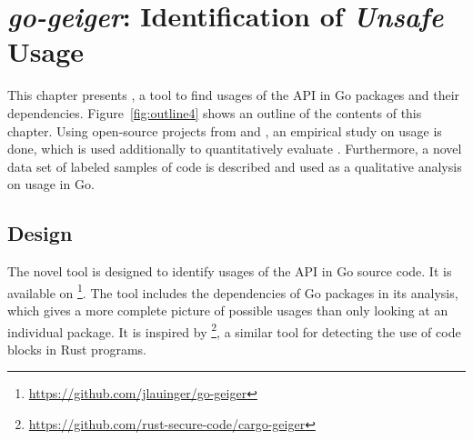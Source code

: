 
\chapter{\textit{go-geiger}: Identification of \textit{Unsafe} Usage}\label{ch:go-geiger}

This chapter presents \toolGeiger{}, a tool to find usages of the \unsafe{} \acrshort{API} in Go packages and their
dependencies.
Figure~\ref{fig:outline4} shows an outline of the contents of this chapter.
Using open-source projects from \github{} and \toolGeiger{}, an empirical study on \unsafe{} usage is done, which is
used additionally to quantitatively evaluate \toolGeiger{}.
Furthermore, a novel data set of labeled samples of \unsafe{} code is described and used as a qualitative analysis on
\unsafe{} usage in Go.





\section{Design}\label{sec:go-geiger:design}

The novel tool \toolGeiger{} is designed to identify usages of the \unsafe{} \acrshort{API} in Go source code.
It is available on \github{}\footnote{\url{https://github.com/jlauinger/go-geiger}}.
The tool includes the dependencies of Go packages in its analysis, which gives a more complete picture of possible
\unsafe{} usages than only looking at an individual package.
It is inspired by \toolCargoGeiger{}\footnote{\url{https://github.com/rust-secure-code/cargo-geiger}}, a similar tool
for detecting the use of \unsafe{} code blocks in Rust programs.



